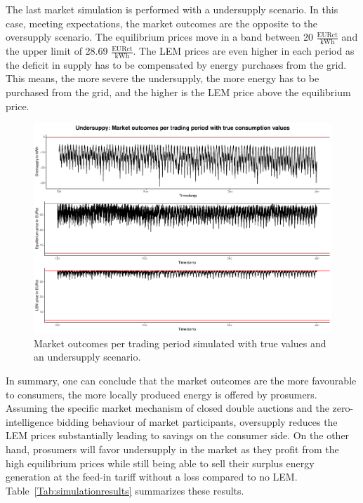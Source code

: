 The last market simulation is performed with a undersupply scenario. In this case, meeting expectations, the market outcomes are the opposite to the oversupply scenario. The equilibrium prices move in a band between 20 $\frac{\text{EURct}}{\text{kWh}}$ and the upper limit of 28.69 $\frac{\text{EURct}}{\text{kWh}}$. The LEM prices are even higher in each period as the deficit in supply has to be compensated by energy purchases from the grid. This means, the more severe the undersupply, the more energy has to be purchased from the grid, and the higher is the LEM price above the equilibrium price.
%
\begin{figure}[htbp]
    \centering
    \includegraphics[width=\textwidth]{thesis/graphs/marketsimulation/marketoutcome_true_undersupply.pdf}
    \caption[Market outcomes simulated with undersupply and true values]{Market outcomes per trading period simulated with true values and an undersupply scenario. \quantnet\href{}{}}
    \label{Fig:marketoutcomes_true_under}
\end{figure}
%

In summary, one can conclude that the market outcomes are the more favourable to consumers, the more locally produced energy is offered by prosumers. Assuming the specific market mechanism of closed double auctions and the zero-intelligence bidding behaviour of market participants, oversupply reduces the LEM prices substantially leading to savings on the consumer side. On the other hand, prosumers will favor undersupply in the market as they profit from the high equilibrium prices while still being able to sell their surplus energy generation at the feed-in tariff without a loss compared to no LEM. Table~\ref{Tab:simulationresults} summarizes these results.


